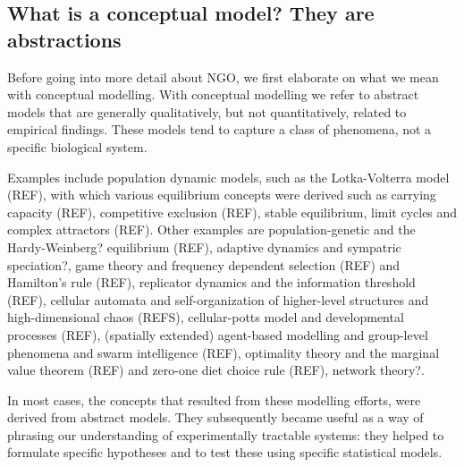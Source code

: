 \subsection{What is a conceptual model? They are abstractions}

Before going into more detail about NGO, we first elaborate on what we mean with conceptual modelling. With conceptual modelling we refer to abstract models that are generally qualitatively, but not quantitatively, related to empirical findings. These models tend to capture a class of phenomena, not a specific biological system.

Examples include population dynamic models, such as the Lotka-Volterra model (REF), with which various equilibrium concepts were derived such as carrying capacity (REF), competitive exclusion (REF), stable equilibrium, limit cycles and complex attractors (REF). Other examples are population-genetic and the Hardy-Weinberg? equilibrium (REF), adaptive dynamics and sympatric speciation?, game theory and frequency dependent selection (REF) and Hamilton’s rule (REF), replicator dynamics and the information threshold (REF), cellular automata and self-organization of higher-level structures and high-dimensional chaos (REFS), cellular-potts model and developmental processes (REF), (spatially extended) agent-based modelling and group-level phenomena and swarm intelligence (REF), optimality theory and the marginal value theorem (REF) and zero-one diet choice rule (REF), network theory?.

In most cases, the concepts that resulted from these modelling efforts, were derived from abstract models. They subsequently became useful as a way of phrasing our understanding of experimentally tractable systems: they helped to formulate specific hypotheses and to test these using specific statistical models.
  